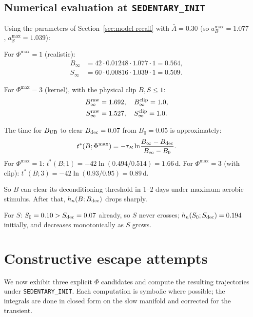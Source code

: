 \documentclass[11pt,a4paper]{article}
\theoremstyle{definition}
\begin{document}
\subsection{Numerical evaluation at \texttt{SEDENTARY\_INIT}}

Using the parameters of Section~\ref{sec:model-recall} with $\bar A = 0.30$ (so $a_B^{\max} = 1.077$, $a_S^{\max} = 1.039$):

For $\Phi^{\max} = 1$ (realistic):
\begin{align*}
B_\infty &= 42 \cdot 0.01248 \cdot 1.077 \cdot 1 = 0.564, \\
S_\infty &= 60 \cdot 0.00816 \cdot 1.039 \cdot 1 = 0.509.
\end{align*}

For $\Phi^{\max} = 3$ (kernel), with the physical clip $B, S \le 1$:
\begin{align*}
B_\infty^{\rm raw} &= 1.692, \quad B_\infty^{\rm clip} = 1.0, \\
S_\infty^{\rm raw} &= 1.527, \quad S_\infty^{\rm clip} = 1.0.
\end{align*}

The time for $B_{\rm UB}$ to clear $B_{\rm dec} = 0.07$ from $B_0 = 0.05$ is approximately:
\[
t^*(B; \Phi^{\max}) = -\tau_B \ln\!\frac{B_\infty - B_{\rm dec}}{B_\infty - B_0}.
\]
For $\Phi^{\max} = 1$: $t^*(B; 1) = -42 \ln(0.494/0.514) = 1.66$\,d.
For $\Phi^{\max} = 3$ (with clip): $t^*(B; 3) = -42 \ln(0.93/0.95) = 0.89$\,d.

So $B$ can clear its deconditioning threshold in 1--2 days under maximum aerobic stimulus. After that, $h_n(B; B_{\rm dec})$ drops sharply.

For $S$: $S_0 = 0.10 > S_{\rm dec} = 0.07$ already, so $S$ never crosses; $h_n(S_0; S_{\rm dec}) = 0.194$ initially, and decreases monotonically as $S$ grows.

\section{Constructive escape attempts} \label{sec:constructive}

We now exhibit three explicit $\Phi$ candidates and compute the resulting trajectories under \texttt{SEDENTARY\_INIT}. Each computation is symbolic where possible; the integrals are done in closed form on the slow manifold and corrected for the transient.
\end{document}
